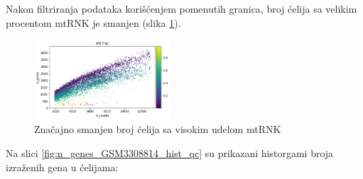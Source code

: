 \documentclass{article}
\begin{document}
Nakon filtriranja podataka korišćenjem pomenutih granica, broj ćelija sa velikim procentom mtRNK je smanjen (slika \ref{fig:mt_frac_GSM14_after_filtering}). 

\begin{figure}[H]
    \centering
    \includegraphics[width=0.45\textwidth]{GSM3308814-genes-counts-filtered.png}
    \caption{ Značajno smanjen broj ćelija sa visokim udelom mtRNK }
    \label{fig:mt_frac_GSM14_after_filtering}
\end{figure}

Na slici \ref{fig:n_genes_GSM3308814_hist_qc} su prikazani historgami broja izraženih gena u ćelijama:
\end{document}
